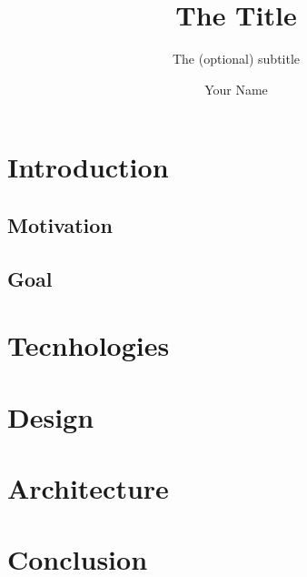 \documentclass[]{usiinfbachelorproject}
\author{Your Name}
\title{The Title}
\subtitle{The (optional) subtitle}
\begin{document}
\maketitle

\section{Introduction} \label{introduction}
\subsection{Motivation}
\subsection{Goal}

\section{Tecnhologies} \label{tecnhologies}

\section{Design} \label{design}

\section{Architecture} \label{architecture}

\section{Conclusion} \label{conclusion}



%
\end{document}
